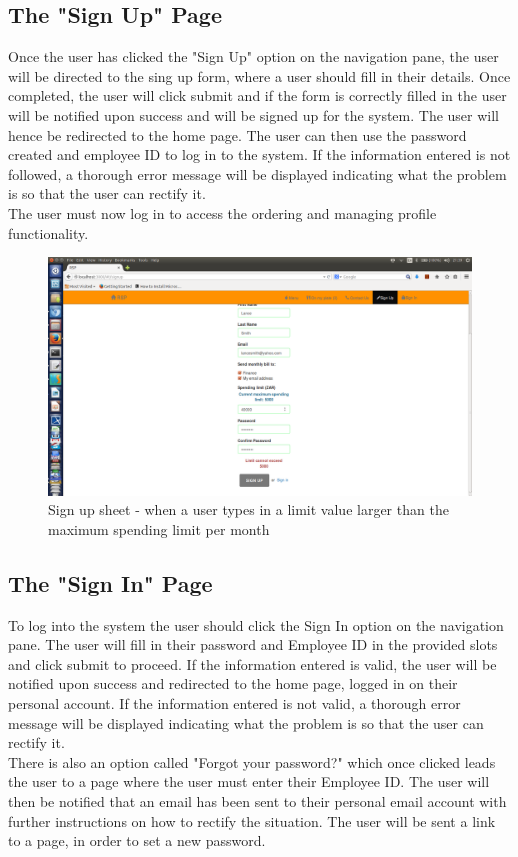 \documentclass[a4paper,12pt]{article}
\begin{document}
\subsection{The "Sign Up" Page} 
Once the user has clicked the "Sign Up" option on the navigation pane, the user will be directed to the sing up form, where a user should fill in their details. Once completed, the user will click submit and if the form is correctly filled in the user will be notified upon success and will be signed up for the system. The user will hence be redirected to the home page. The user can then use the password created and employee ID to log in to the system. If the information entered is not followed, a thorough error message will be displayed indicating what the problem is so that the user can rectify it.
\\
The user must now log in to access the ordering and managing profile functionality.
\begin{figure}[H]
  \centering
    \includegraphics[width=1.0\textwidth]{screenshots/limitExeedSignUp.png}
    \caption{Sign up sheet - when a user types in a limit value larger than the maximum spending limit per month} 
\end{figure}

\subsection{The "Sign In" Page} 
To log into the system the user should click the Sign In option on the navigation pane. The user will fill in their password and Employee ID in the provided slots and click submit to proceed. If the information entered is valid, the user will be notified upon success and redirected to the home page, logged in on their personal account. If the information entered is not valid, a thorough error message will be displayed indicating what the problem is so that the user can rectify it.
\\
There is also an option called "Forgot your password?" which once clicked leads the user to a page where the user must enter their Employee ID. The user will then be notified that an email has been sent to their personal email account with further instructions on how to rectify the situation. The user will be sent a link to a page, in order to set a new password.   
\end{document}
